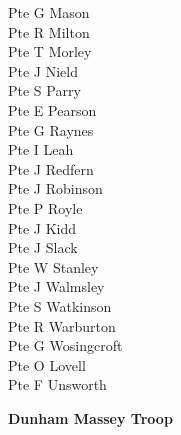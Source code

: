 \begin{multicols}{3}
  Pte G Mason \\
  Pte R Milton \\
  Pte T Morley \\
  Pte J Nield \\
  Pte S Parry \\
  Pte E Pearson \\
  Pte G Raynes \\
  Pte I Leah \\
  Pte J Redfern \\
  Pte J Robinson \\
  Pte P Royle \\
  Pte J Kidd \\
  Pte J Slack \\
  Pte W Stanley \\
  Pte J Walmsley \\
  Pte S Watkinson \\
  Pte R Warburton \\
  Pte G Wosingcroft \\
  Pte O Lovell \\
  Pte F Unsworth \\
\end{multicols}

\vspace*{10mm}

\begin{center}
  \Large
  \textbf{Dunham Massey Troop}
\end{center}

